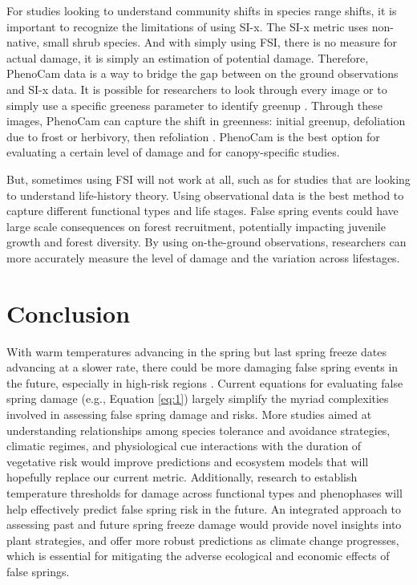 \documentclass{article}\usepackage[]{graphicx}\usepackage[]{color}
\begin{document}
For studies looking to understand community shifts in species range shifts, it is important to recognize the limitations of using SI-x. The SI-x metric uses non-native, small shrub species. And with simply using FSI, there is no measure for actual damage, it is simply an estimation of potential damage. Therefore, PhenoCam data is a way to bridge the gap between on the ground observations and SI-x data. It is possible for researchers to look through every image or to simply use a specific greeness parameter to identify greenup \citep{Richardson2018}. Through these images, PhenoCam can capture the shift in greenness: initial greenup, defoliation due to frost or herbivory, then refoliation \citep{Richardson2018b}. PhenoCam is the best option for evaluating a certain level of damage and for canopy-specific studies. 

But, sometimes using FSI will not work at all, such as for studies that are looking to understand life-history theory. Using observational data is the best method to capture different functional types and life stages. False spring events could have large scale consequences on forest recruitment, potentially impacting juvenile growth and forest diversity. By using on-the-ground observations, researchers can more accurately measure the level of damage and the variation across lifestages. 


\section*{Conclusion}
 
With warm temperatures advancing in the spring but last spring freeze dates advancing at a slower rate, there could be more damaging false spring events in the future, especially in high-risk regions \citep{Gu2008, Inouye2008, Liu2018}. Current equations for evaluating false spring damage (e.g., Equation \ref{eq:1}) largely simplify the myriad complexities involved in assessing false spring damage and risks. More studies aimed at understanding relationships among species tolerance and avoidance strategies, climatic regimes, and physiological cue interactions with the duration of vegetative risk would improve predictions and ecosystem models that will hopefully replace our current metric. Additionally, research to establish temperature thresholds for damage across functional types and phenophases will help effectively predict false spring risk in the future. An integrated approach to assessing past and future spring freeze damage would provide novel insights into plant strategies, and offer more robust predictions as climate change progresses, which is essential for mitigating the adverse ecological and economic effects of false springs.
\end{document}
